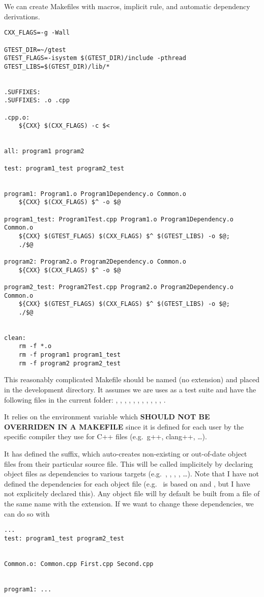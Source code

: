 \documentclass[12pt]{article}
\begin{document}
We can create Makefiles with macros, implicit rule, and automatic dependency derivations.

\begin{verbatim}
CXX_FLAGS=-g -Wall

GTEST_DIR=~/gtest
GTEST_FLAGS=-isystem $(GTEST_DIR)/include -pthread
GTEST_LIBS=$(GTEST_DIR)/lib/*


.SUFFIXES:
.SUFFIXES: .o .cpp

.cpp.o:
    ${CXX} $(CXX_FLAGS) -c $<


all: program1 program2

test: program1_test program2_test


program1: Program1.o Program1Dependency.o Common.o
    ${CXX} $(CXX_FLAGS) $^ -o $@

program1_test: Program1Test.cpp Program1.o Program1Dependency.o Common.o
    ${CXX} $(GTEST_FLAGS) $(CXX_FLAGS) $^ $(GTEST_LIBS) -o $@;
    ./$@

program2: Program2.o Program2Dependency.o Common.o
    ${CXX} $(CXX_FLAGS) $^ -o $@

program2_test: Program2Test.cpp Program2.o Program2Dependency.o Common.o
    ${CXX} $(GTEST_FLAGS) $(CXX_FLAGS) $^ $(GTEST_LIBS) -o $@;
    ./$@


clean:
    rm -f *.o
    rm -f program1 program1_test
    rm -f program2 program2_test
\end{verbatim}

This reasonably complicated Makefile should be named  (no extension) and placed in the development directory. It assumes we are uses  as a test suite and have the following files in the current folder: , , , , , , , , , , , 
.

It relies on the  environment variable which {\bf SHOULD NOT BE OVERRIDEN IN A MAKEFILE} since it is defined for each user by the specific compiler they use for C++ files (e.g.\ g++, clang++, \dots).

It has defined the  suffix, which auto-creates non-existing or out-of-date object files from their particular source file. This will be called implicitely by declaring object files as dependencies to various targets (e.g.\ , , , , \dots). Note that I have not defined the dependencies for each object file (e.g.\  is based on  and , but I have not explicitely declared this). Any object file will by default be built from a file of the same name with the  extension. If we want to change these dependencies, we can do so with
\begin{verbatim}
...
test: program1_test program2_test


Common.o: Common.cpp First.cpp Second.cpp


program1: ...
\end{verbatim}
\end{document}
